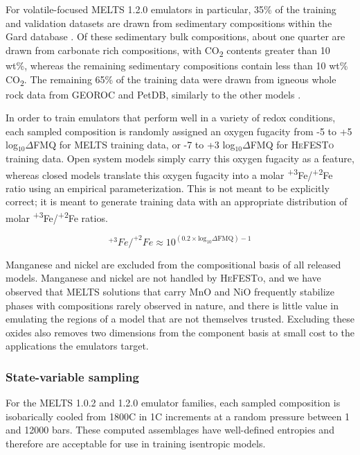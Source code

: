 For volatile-focused \textsc{MELTS} 1.2.0 emulators in particular, 35\% of the training and validation datasets are drawn from sedimentary compositions within the Gard database \citep{gard2019}. Of these sedimentary bulk compositions, about one quarter are drawn from carbonate rich compositions, with CO\textsubscript{2} contents greater than 10 wt\%, whereas the remaining sedimentary compositions contain less than 10 wt\% CO\textsubscript{2}. The remaining 65\% of the training data were drawn from
igneous whole rock data from GEOROC and PetDB, similarly to the other models \citep{GEOROC,PetDB}. 

In order to train emulators that perform well in a variety of redox conditions, 
each sampled composition is randomly assigned an oxygen fugacity from -5 to +5 log$_{10}\Delta$FMQ for \textsc{MELTS} training data, or -7 to +3 log$_{10}\Delta$FMQ for \textsc{HeFESTo} training data. Open 
system models simply carry this oxygen fugacity as a feature, whereas closed models translate this oxygen fugacity into a molar \textsuperscript{+3}Fe/\textsuperscript{+2}Fe ratio using an empirical parameterization. This is not meant to be explicitly correct; it is meant to generate training data with an appropriate distribution of molar \textsuperscript{+3}Fe/\textsuperscript{+2}Fe ratios.

\begin{equation}
^{+3}Fe/^{+2}Fe \approx 10^{\left(0.2 \times \text{log}_{10}\Delta\text{FMQ} \right) - 1}
\label{eq:fO2ratio}
\end{equation}

Manganese and nickel are excluded from the compositional basis of all released
models. Manganese and nickel are not handled by \textsc{HeFESTo}, and we have 
observed that \textsc{MELTS} solutions that carry MnO and NiO frequently stabilize
phases with compositions rarely observed in nature, and there is little value in
emulating the regions of a model that are not themselves trusted. Excluding these
oxides also removes two dimensions from the component basis at small cost to
the applications the emulators target.

\subsubsection{State-variable sampling}\label{stae-var-sampling}

For the \textsc{MELTS} 1.0.2 and 1.2.0 emulator families, each sampled composition is isobarically cooled from 1800\textdegree C in 1\textdegree C increments at a random pressure between 1 and 12000 bars. These computed assemblages have well-defined entropies and therefore are acceptable for use in training isentropic models. 

